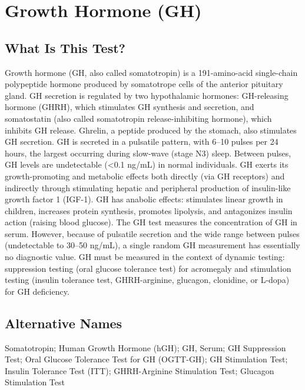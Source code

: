 \chapter{Growth Hormone (GH)}

\section*{What Is This Test?}
Growth hormone (GH, also called somatotropin) is a 191-amino-acid single-chain polypeptide hormone produced by somatotrope cells of the anterior pituitary gland. GH secretion is regulated by two hypothalamic hormones: GH-releasing hormone (GHRH), which stimulates GH synthesis and secretion, and somatostatin (also called somatotropin release-inhibiting hormone), which inhibits GH release. Ghrelin, a peptide produced by the stomach, also stimulates GH secretion. GH is secreted in a pulsatile pattern, with 6--10 pulses per 24 hours, the largest occurring during slow-wave (stage N3) sleep. Between pulses, GH levels are undetectable (<0.1 ng/mL) in normal individuals. GH exerts its growth-promoting and metabolic effects both directly (via GH receptors) and indirectly through stimulating hepatic and peripheral production of insulin-like growth factor 1 (IGF-1). GH has anabolic effects: stimulates linear growth in children, increases protein synthesis, promotes lipolysis, and antagonizes insulin action (raising blood glucose). The GH test measures the concentration of GH in serum. However, because of pulsatile secretion and the wide range between pulses (undetectable to 30--50 ng/mL), a single random GH measurement has essentially no diagnostic value. GH must be measured in the context of dynamic testing: suppression testing (oral glucose tolerance test) for acromegaly and stimulation testing (insulin tolerance test, GHRH-arginine, glucagon, clonidine, or L-dopa) for GH deficiency.

\section*{Alternative Names}
Somatotropin; Human Growth Hormone (hGH); GH, Serum; GH Suppression Test; Oral Glucose Tolerance Test for GH (OGTT-GH); GH Stimulation Test; Insulin Tolerance Test (ITT); GHRH-Arginine Stimulation Test; Glucagon Stimulation Test

